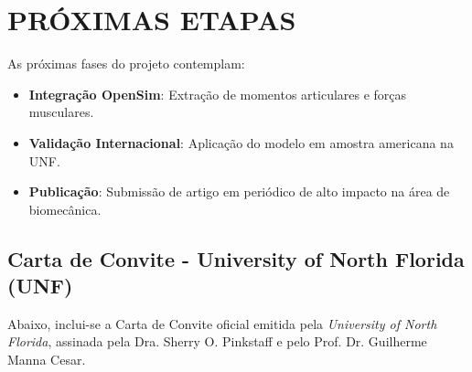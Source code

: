 \documentclass{article}
\begin{document}
\section{PRÓXIMAS ETAPAS}
As próximas fases do projeto contemplam:
\begin{itemize}
    \item \textbf{Integração OpenSim}: Extração de momentos articulares e forças musculares.
    \item \textbf{Validação Internacional}: Aplicação do modelo em amostra americana na UNF.
    \item \textbf{Publicação}: Submissão de artigo em periódico de alto impacto na área de biomecânica.
\end{itemize}


\newpage
%



\newpage
\begin{appendices}
\section{Carta de Convite - University of North Florida (UNF)}
\label{apice:carta_unf}
Abaixo, inclui-se a Carta de Convite oficial emitida pela \textit{University of North Florida}, assinada pela Dra. Sherry O. Pinkstaff e pelo Prof. Dr. Guilherme Manna Cesar.


\end{appendices}
\end{document}
